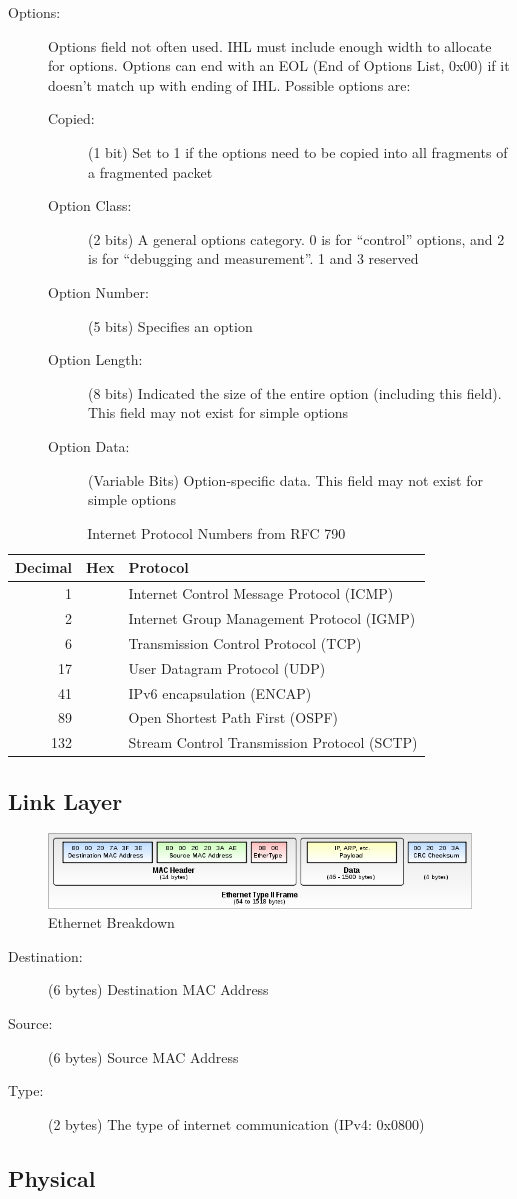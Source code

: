 \begin{description}
	\item[Options:] Options field not often used. IHL must include enough width to allocate for options. Options can end with an EOL (End of Options List, 0x00) if it doesn't match up with ending of IHL. Possible options are:
	\begin{description}
		\item[Copied:] (1 bit) Set to 1 if the options need to be copied into all fragments of a fragmented packet
		\item[Option Class:] (2 bits) A general options category. 0 is for ``control'' options, and 2 is for ``debugging and measurement''. 1 and 3 reserved
		\item[Option Number:] (5 bits) Specifies an option
		\item[Option Length:] (8 bits) Indicated the size of the entire option (including this field). This field may not exist for simple options
		\item[Option Data:] (Variable Bits) Option-specific data. This field may not exist for simple options
	\end{description}
\end{description}
\begin{table}[H]
	\centering
	\caption{Internet Protocol Numbers from RFC 790}\label{fig:protocols}
	\begin{tabular}{rrl}
	\toprule
	Decimal & Hex & Protocol\\
	\midrule
	1 && Internet Control Message Protocol (ICMP)\\
	2 && Internet Group Management Protocol (IGMP)\\
	6 && Transmission Control Protocol (TCP)\\
	17 && User Datagram Protocol (UDP)\\
	41 && IPv6 encapsulation (ENCAP)\\
	89 && Open Shortest Path First (OSPF)\\
	132 && Stream Control Transmission Protocol (SCTP)\\
	\bottomrule
	\end{tabular}
\end{table}

\subsection{Link Layer}
\begin{figure}[H]
	\includegraphics[width=\linewidth]{ethernet}
	\centering
	\caption{Ethernet Breakdown}
\end{figure}
\begin{description}
	\item[Destination:] (6 bytes) Destination MAC Address
	\item[Source:] (6 bytes) Source MAC Address
	\item[Type:] (2 bytes) The type of internet communication (IPv4: 0x0800)
\end{description}
\subsection{Physical}
